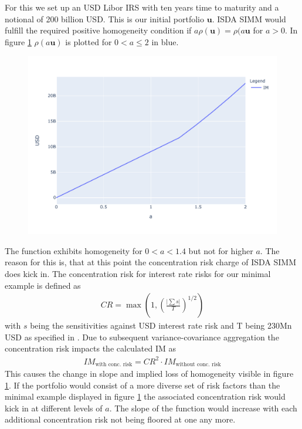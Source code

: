 \documentclass[../Thesis_AHoecherl.tex]{subfiles}
\begin{document}
    For this we set up an USD Libor IRS with ten years time to maturity and a notional of 200 billion USD. This is our initial portfolio $\mathbf{u}$. ISDA SIMM would fulfill the required positive homogeneity condition if $a \rho(\mathbf{u}) = \rho(a \mathbf{u}$ for $a>0$. In figure \ref{fig:homogeneity of ISDA SIMM} $\rho(a\mathbf{u})$ is plotted for $0<a\leq 2$ in blue. 
    \begin{figure}
        \centering
        \includegraphics{Graphics/ISDA_SIMM_homogenity.pdf}
        \caption{}
        \label{fig:homogeneity of ISDA SIMM}
    \end{figure}
    The function exhibits homogeneity for $0<a<1.4$  but not for higher $a$. 
    The reason for this is, that at this point the concentration risk charge of ISDA SIMM does kick in.
    The concentration risk for interest rate risks for our minimal example is defined as \cite[Article 7.b]{SIMM}
    \begin{align*}
        CR = \max\left(1,\left(\frac{\lvert\sum{s}\rvert}{T}\right)^{1/2}\right)
    \end{align*}
    with $s$ being the sensitivities against USD interest rate risk and T being 230Mn USD as specified in \cite[Article 74]{SIMM}. Due to subsequent variance-covariance aggregation the concentration risk impacts the calculated IM as
    \begin{align*}
        IM_{\text{with conc. risk}} = CR^2 \cdot IM_{\text{without conc. risk}}
    \end{align*}
    This causes the change in slope and implied loss of homogeneity visible in figure \ref{fig:homogeneity of ISDA SIMM}. If the portfolio would consist of a more diverse set of risk factors than the minimal example displayed in figure \ref{fig:homogeneity of ISDA SIMM} the associated concentration risk would kick in at different levels of $a$.
    The slope of the function would increase with each additional concentration risk not being floored at one any more. 
    
\end{document}

